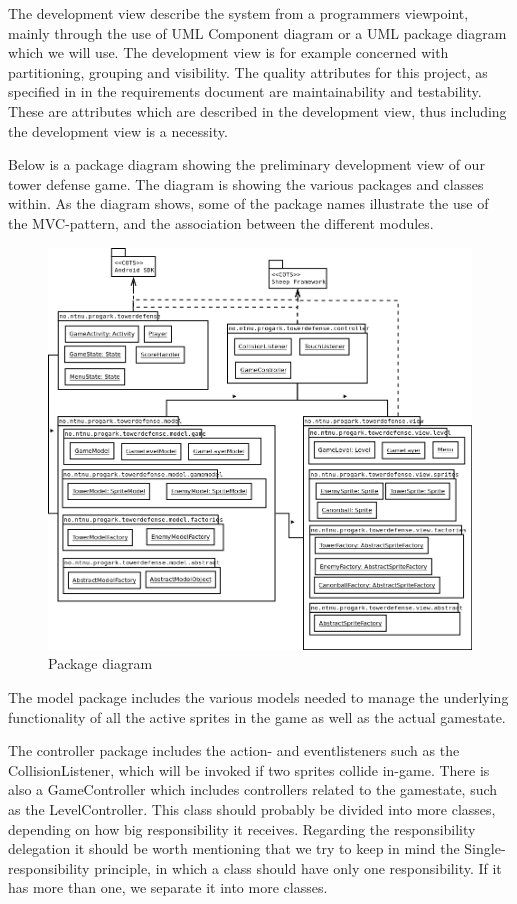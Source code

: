 The development view describe the system from a programmers viewpoint, mainly through the use of UML Component diagram or a UML package diagram which we will use.  The development view is for example concerned with partitioning, grouping and visibility. The quality attributes for this project, as specified in in the requirements document \cite{reqdoc} are maintainability and testability. These are attributes which are described in the development view, thus including the development view is a necessity. 


Below is a package diagram showing the preliminary development view of our tower defense game. The diagram is showing the various packages and classes within. As the diagram shows, some of the package names illustrate the use of the MVC-pattern, and the association between the different modules.

\begin{figure}[h]
\center
\includegraphics[width=1\linewidth ]{images/pDiagram.png}
\caption{Package diagram}
\end{figure}

The model package includes the various models needed to manage the underlying functionality of all the active sprites in the game as well as the actual gamestate. 


The controller package includes the action- and eventlisteners such as the CollisionListener, which will be invoked if two sprites collide in-game. There is also a GameController which includes controllers related to the gamestate, such as the LevelController. This class should probably be divided into more classes, depending on how big responsibility it receives. Regarding the responsibility delegation it should be worth mentioning that we try to keep in mind the Single-responsibility principle, in which a class should have only one responsibility. If it has more than one, we separate it into more classes.

